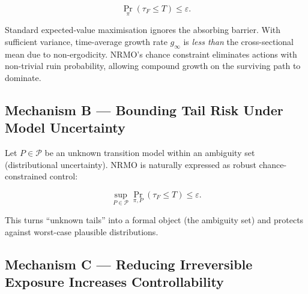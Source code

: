 \begin{equation}
\Pr_\pi(\tau_F \le T) \le \varepsilon.
\label{eq:foundations-mech-a-constraint}
\end{equation}

Standard expected-value maximisation ignores the absorbing barrier.
With sufficient variance, time-average growth rate $g_\infty$ is
\emph{less than} the cross-sectional mean due to non-ergodicity.
NRMO's chance constraint eliminates actions with non-trivial ruin
probability, allowing compound growth on the surviving path to
dominate.

\subsection*{Mechanism B --- Bounding Tail Risk Under Model Uncertainty}

Let $P \in \mathcal{P}$ be an unknown transition model within an
ambiguity set (distributional uncertainty). NRMO is naturally
expressed as robust chance-constrained control:

\begin{equation}
\sup_{P \in \mathcal{P}} \Pr_{\pi, P}(\tau_F \le T) \le \varepsilon.
\label{eq:foundations-mech-b-constraint}
\end{equation}

This turns ``unknown tails'' into a formal object (the ambiguity
set) and protects against worst-case plausible distributions.


\subsection*{Mechanism C --- Reducing Irreversible Exposure Increases
Controllability}

